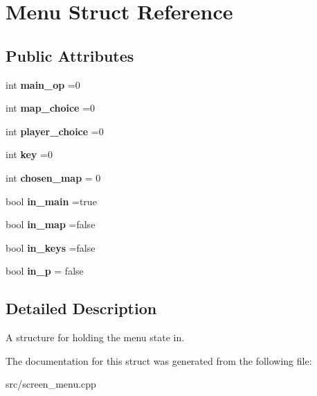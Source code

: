 \hypertarget{structMenu}{}\section{Menu Struct Reference}
\label{structMenu}
\subsection*{Public Attributes}
\begin{DoxyCompactItemize}
\item 
\hypertarget{structMenu_a483ad7c1a39c050e33084a03c7769c33}{}\label{structMenu_a483ad7c1a39c050e33084a03c7769c33} 
int {\bfseries main\+\_\+op} =0
\item 
\hypertarget{structMenu_a5b2947be8d42f2323b1f384d8a56d9f8}{}\label{structMenu_a5b2947be8d42f2323b1f384d8a56d9f8} 
int {\bfseries map\+\_\+choice} =0
\item 
\hypertarget{structMenu_aa9d3a590d1b2a6b3e228506bf64e60b4}{}\label{structMenu_aa9d3a590d1b2a6b3e228506bf64e60b4} 
int {\bfseries player\+\_\+choice} =0
\item 
\hypertarget{structMenu_a16fa60b127cf50b1622b743ed271414e}{}\label{structMenu_a16fa60b127cf50b1622b743ed271414e} 
int {\bfseries key} =0
\item 
\hypertarget{structMenu_af2a7cc455d6a726b3cea639ed557976a}{}\label{structMenu_af2a7cc455d6a726b3cea639ed557976a} 
int {\bfseries chosen\+\_\+map} = 0
\item 
\hypertarget{structMenu_a29088eebb78bcb5a4d14c4b81ff53e02}{}\label{structMenu_a29088eebb78bcb5a4d14c4b81ff53e02} 
bool {\bfseries in\+\_\+main} =true
\item 
\hypertarget{structMenu_a70dc6095001f5930485e089ac4f08b42}{}\label{structMenu_a70dc6095001f5930485e089ac4f08b42} 
bool {\bfseries in\+\_\+map} =false
\item 
\hypertarget{structMenu_a99f864aea69c9f9a11871be7d4d96305}{}\label{structMenu_a99f864aea69c9f9a11871be7d4d96305} 
bool {\bfseries in\+\_\+keys} =false
\item 
\hypertarget{structMenu_a68ed738dc56e7fae1c923a8243a67778}{}\label{structMenu_a68ed738dc56e7fae1c923a8243a67778} 
bool {\bfseries in\+\_\+p} = false
\end{DoxyCompactItemize}


\subsection{Detailed Description}
A structure for holding the menu state in. 

The documentation for this struct was generated from the following file\+:\begin{DoxyCompactItemize}
\item 
src/screen\+\_\+menu.\+cpp\end{DoxyCompactItemize}
